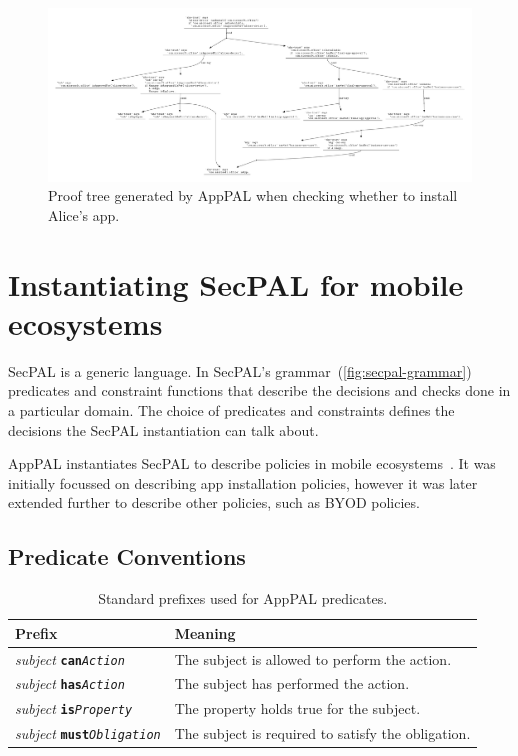 \documentclass[thesis.tex]{subfiles}
\begin{document}
\begin{figure}
  \centering
  \includegraphics[width=0.9\textheight, angle=90]{figures/exemplar-proof.pdf}
  \caption[Proof tree output by AppPAL]{Proof tree generated by AppPAL when checking whether to install Alice's app.}
  \label{fig:exemplar-proof}
\end{figure}

\section{Instantiating SecPAL for mobile ecosystems}
\label{sec:instantiating}

SecPAL is a generic language.  In SecPAL's
grammar~(\autoref{fig:secpal-grammar}) predicates and constraint
functions that describe the decisions and checks done in a particular
domain.  The choice of predicates and constraints defines the
decisions the SecPAL instantiation can talk about.

AppPAL instantiates SecPAL to describe policies in mobile
ecosystems~\cite{hallett_apppal_2016}.  It was initially focussed on
describing app installation policies, however it was later extended
further to describe other policies, such as \ac{BYOD} policies.

\subsection{Predicate Conventions}
\label{ssec:types}

\newcommand{\descPred}[2]{\emph{subject} \texttt{\textbf{#1}\emph{#2}}}
\begin{table}
  \begin{tabular}{l l}
    \toprule
    Prefix                      & Meaning                                            \\
    \midrule
    \descPred{can}{Action}      & The subject is allowed to perform the action.      \\
    \descPred{has}{Action}      & The subject has performed the action.              \\
    \descPred{is}{Property}     & The property holds true for the subject.           \\
    \descPred{must}{Obligation} & The subject is required to satisfy the obligation. \\
    \bottomrule
  \end{tabular}
  \caption{Standard prefixes used for AppPAL predicates.}
  \label{tab:predicate-prefixes}
\end{table}
\end{document}
